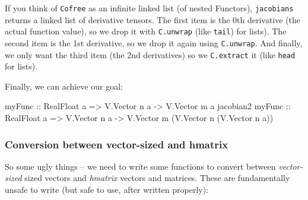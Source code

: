\documentclass[]{article}
\newenvironment{Shaded}{}{}
\newcommand{\DataTypeTok}[1]{\textcolor[rgb]{0.56,0.13,0.00}{#1}}
\newcommand{\OtherTok}[1]{\textcolor[rgb]{0.00,0.44,0.13}{#1}}
\newcommand{\NormalTok}[1]{#1}
\begin{document}
If you think of \texttt{Cofree} as an infinite linked list (of nested Functors),
\texttt{jacobians} returns a linked list of derivative tensors. The first item
is the 0th derivative (the actual function value), so we drop it with
\texttt{C.unwrap} (like \texttt{tail}) for lists). The second item is the 1st
derivative, so we drop it again using \texttt{C.unwrap}. And finally, we only
want the third item (the 2nd derivatives) so we \texttt{C.extract} it (like
\texttt{head} for lists).

Finally, we can achieve our goal:

\begin{Shaded}
\begin{Highlighting}[]
\NormalTok{myFunc}
\OtherTok{    ::} \DataTypeTok{RealFloat}\NormalTok{ a }\OtherTok{=>} \DataTypeTok{V.Vector}\NormalTok{ n a }\OtherTok{->} \DataTypeTok{V.Vector}\NormalTok{ m a}
\NormalTok{jacobian2 myFunc}
\OtherTok{    ::} \DataTypeTok{RealFloat}\NormalTok{ a }\OtherTok{=>} \DataTypeTok{V.Vector}\NormalTok{ n a }\OtherTok{->} \DataTypeTok{V.Vector}\NormalTok{ m (}\DataTypeTok{V.Vector}\NormalTok{ n (}\DataTypeTok{V.Vector}\NormalTok{ n a))}
\end{Highlighting}
\end{Shaded}

\subsubsection{Conversion between vector-sized and
hmatrix}\label{conversion-between-vector-sized-and-hmatrix}

So some ugly things -- we need to write some functions to convert between
\emph{vector-sized} sized vectors and \emph{hmatrix} vectors and matrices. These
are fundamentally unsafe to write (but safe to use, after written properly):
\end{document}
